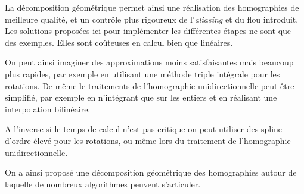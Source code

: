 
La décomposition géométrique permet ainsi une réalisation des homographies de meilleure qualité, et un contrôle plus rigoureux de l'\emph{aliasing} et du flou introduit. Les solutions proposées ici pour implémenter les différentes étapes ne sont que des exemples. Elles sont coûteuses en calcul bien que linéaires. 

On peut ainsi imaginer des approximations moins satisfaisantes mais beaucoup plus rapides, par exemple en utilisant une méthode triple intégrale pour les rotations. De même le traitements de l'homographie unidirectionnelle peut-être simplifié, par exemple en n'intégrant que sur les entiers et en réalisant une interpolation bilinéaire.

A l'inverse si le temps de calcul n'est pas critique on peut utiliser des spline d'ordre élevé pour les rotations, ou même lors du traitement de l'homographie unidirectionnelle.

On a ainsi proposé une décomposition géométrique des homographies autour de laquelle de nombreux algorithmes peuvent s'articuler.

